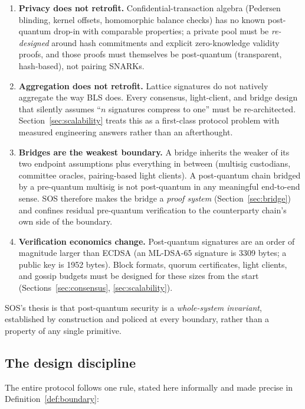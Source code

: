 \documentclass[11pt]{article}
\newcommand{\mldsa}{ML\mbox{-}DSA\mbox{-}65}
\theoremstyle{plain}
\theoremstyle{definition}
\theoremstyle{remark}
\begin{document}
\begin{enumerate}[leftmargin=1.6em]
\item \textbf{Privacy does not retrofit.} Confidential-transaction algebra
  (Pedersen blinding, kernel offsets, homomorphic balance checks) has no known
  post-quantum drop-in with comparable properties; a private pool must be
  \emph{re-designed} around hash commitments and explicit zero-knowledge
  validity proofs, and those proofs must themselves be post-quantum
  (transparent, hash-based), not pairing SNARKs.
\item \textbf{Aggregation does not retrofit.} Lattice signatures do not
  natively aggregate the way BLS does. Every consensus, light-client, and
  bridge design that silently assumes ``$n$ signatures compress to one'' must
  be re-architected. Section~\ref{sec:scalability} treats this as a first-class
  protocol problem with measured engineering answers rather than an
  afterthought.
\item \textbf{Bridges are the weakest boundary.} A bridge inherits the
  weaker of its two endpoint assumptions plus everything in between (multisig
  custodians, committee oracles, pairing-based light clients). A post-quantum
  chain bridged by a pre-quantum multisig is not post-quantum in any meaningful
  end-to-end sense. SOS therefore makes the bridge a \emph{proof system}
  (Section~\ref{sec:bridge}) and confines residual pre-quantum verification to
  the counterparty chain's own side of the boundary.
\item \textbf{Verification economics change.} Post-quantum signatures are an
  order of magnitude larger than ECDSA (an \mldsa{} signature is 3309 bytes;
  a public key is 1952 bytes). Block formats, quorum certificates, light
  clients, and gossip budgets must be designed for these sizes from the start
  (Sections~\ref{sec:consensus}, \ref{sec:scalability}).
\end{enumerate}

SOS's thesis is that post-quantum security is a \emph{whole-system invariant},
established by construction and policed at every boundary, rather than a
property of any single primitive.

\subsection{The design discipline}
\label{sec:discipline}

The entire protocol follows one rule, stated here informally and made precise
in Definition~\ref{def:boundary}:
\end{document}
